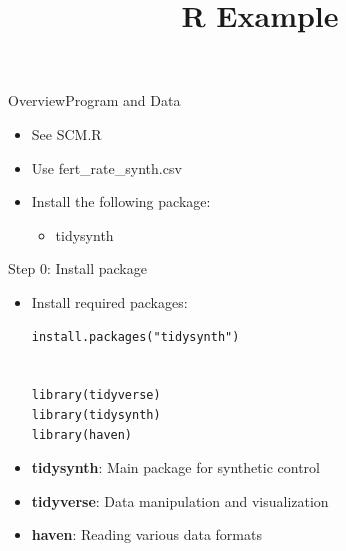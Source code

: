 \documentclass[hyperref={pdfpagelabels=false}]{beamer}
\begin{document}
\title[]  
{R Example}


\author 
{}

\institute{}






\date
{}


\begin{frame}{}
\titlepage
\end{frame}




\begin{frame}{Overview}{Program and Data}
\begin{itemize}
	\item See SCM.R
	\vspace{0.2cm}
	\item Use fert\_rate\_synth.csv
	\vspace{0.2cm}
	\item Install the following package:
	\begin{itemize}
		\vspace{0.2cm}
		\item tidysynth 
		
		
	\end{itemize}
	
\end{itemize}
\end{frame}



\begin{frame}[fragile]{Step 0: Install package}
\begin{itemize}
	\item Install required packages:
	\vspace{0.2cm}
\begin{lstlisting}
install.packages("tidysynth")


library(tidyverse)
library(tidysynth)
library(haven)
\end{lstlisting}
	\item \textbf{tidysynth}: Main package for synthetic control
	\item \textbf{tidyverse}: Data manipulation and visualization
	\item \textbf{haven}: Reading various data formats
\end{itemize}
\end{frame}
\end{document}
